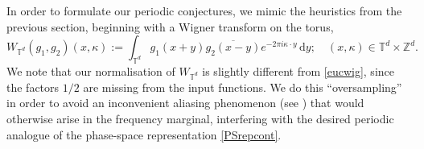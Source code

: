 \documentclass[10pt,a4paper]{amsart}
\numberwithin{equation}{section}
\newcommand{\dd}{\,\mathrm{d}}
\begin{document}
In order to formulate our periodic conjectures, we mimic the heuristics from the previous section, beginning with a Wigner transform on the torus,
\begin{equation*}%
W_{\mathbb{T}^{d}}(g_1,g_2)(x,\kappa):=\int_{\mathbb{T}^d}g_1(x+y)\overline{g_2(x-y)} e^{-2\pi i \kappa\cdot y}\dd y; \quad (x,\kappa)\in\mathbb{T}^d\times\mathbb{Z}^d.
\end{equation*}
We note that our normalisation of $W_{\mathbb{T}^d}$ is slightly different from \eqref{eucwig}, since the factors $1/2$ are missing from the input functions.
We do this ``oversampling'' in order to avoid an inconvenient aliasing phenomenon (see \cite{CM}) that would otherwise arise in the frequency marginal, interfering with the desired periodic analogue of the phase-space representation \eqref{PSrepcont}. 
\end{document}
